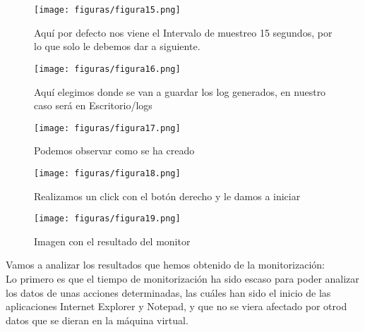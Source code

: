\begin{figure}[H] %
	\centering
	\texttt{[image: figuras/figura15.png]}  %
	\label{figura15}
	
	\caption{Aquí por defecto nos viene el Intervalo de muestreo 15 segundos, por lo que solo le debemos dar a siguiente.} 
\end{figure}
\begin{figure}[H] %
	\centering
	\texttt{[image: figuras/figura16.png]}  %
	\label{figura16}
	
	\caption{Aquí elegimos donde se van a guardar los log generados, en nuestro caso será en Escritorio/logs} 
\end{figure}
\begin{figure}[H] %
	\centering
	\texttt{[image: figuras/figura17.png]}  %
	\label{figura17}
	
	\caption{Podemos observar como se ha creado} 
\end{figure}
\begin{figure}[H] %
	\centering
	\texttt{[image: figuras/figura18.png]}  %
	\label{figura18}
	
	\caption{Realizamos un click con el botón derecho y le damos a iniciar} 
\end{figure}
\begin{figure}[H] %
	\centering
	\texttt{[image: figuras/figura19.png]}  %
	\label{figura19}
	
	\caption{Imagen con el resultado del monitor} 
\end{figure}
Vamos a analizar los resultados que hemos obtenido de la monitorización:\\
Lo primero es que el tiempo de monitorización ha sido escaso para poder analizar los datos de unas acciones determinadas, las cuáles han sido el inicio de las aplicaciones Internet Explorer y Notepad, y que no se viera afectado por otrod datos que se dieran en la máquina virtual.\\
